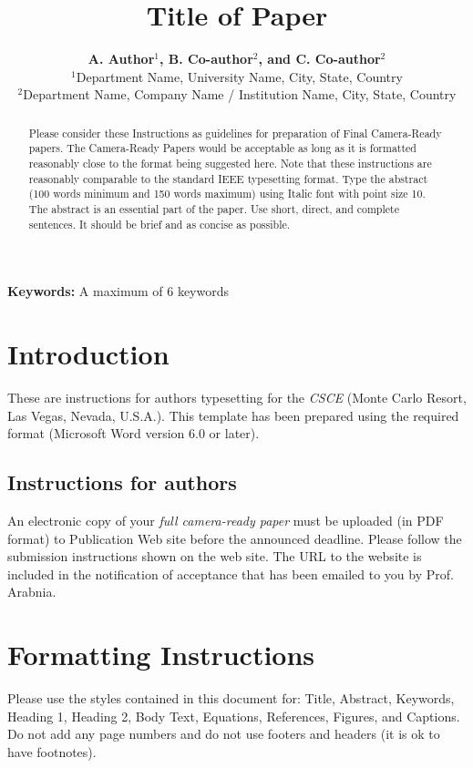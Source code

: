\documentclass[conference]{csce}
\title{\bf Title of Paper}           %
\author{
{\bfseries A. Author$^1$, B. Co-author$^2$, and C. Co-author$^2$}\\
$^1$Department Name, University Name, City, State, Country\\
$^2$Department Name, Company Name / Institution Name, City, State, Country\\
}
\begin{document}
\maketitle                        %


\begin{abstract}%
Please consider these Instructions as guidelines for preparation of 
Final Camera-Ready papers. The Camera-Ready Papers would be acceptable as 
long as it is formatted reasonably close to the format being suggested here. 
Note that these instructions are reasonably comparable to the standard IEEE 
typesetting format. Type the abstract (100 words minimum and 150 words maximum) 
using Italic font with point size 10. The abstract is an essential part of the 
paper. Use short, direct, and complete sentences. It should be brief and as concise as possible.
\end{abstract}


\vspace{1em}
\noindent\textbf{Keywords:}
 {\small  A maximum of 6 keywords} %



\section{Introduction}
These are instructions for authors typesetting for the {\em CSCE} 
(Monte Carlo Resort, Las Vegas, Nevada, U.S.A.). This 
template has been prepared using the required format (Microsoft Word version 6.0 or later). 

\subsection{Instructions for authors}
An electronic copy of your {\em full camera-ready paper} must be uploaded (in PDF format) 
to Publication Web site before the announced deadline. Please follow the submission 
instructions shown on the web site. The URL to the website is included in the 
notification of acceptance that has been emailed to you by Prof. Arabnia.

\section{Formatting Instructions}
Please use the styles contained in this document for: Title, Abstract, Keywords, 
Heading 1, Heading 2, Body Text, Equations, References, Figures, and Captions. 
Do not add any page numbers and do not use footers and headers (it is ok to have footnotes).
\end{document}

